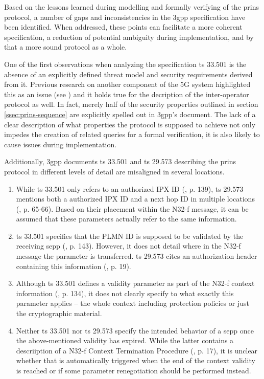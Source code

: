 Based on the lessons learned during modelling and formally verifying of the \gls{prins} protocol, a number of gaps and inconsistencies in the \gls{3gpp} specification have been identified.
When addressed, these points can facilitate a more coherent specification, a reduction of potential ambiguity during implementation, and by that a more sound protocol as a whole.

One of the first observations when analyzing the specification \gls{ts} 33.501 is the absence of an explicitly defined threat model and security requirements derived from it.
Previous research on another component of the 5G system highlighted this as an issue (see \cite{basin2018model}) and it holds true for the decription of the inter-operator protocol as well.
In fact, merely half of the security properties outlined in section \ref{ssec:prins-sequence} are explicitly spelled out in \gls{3gpp}'s document.
The lack of a clear description of what properties the protocol is supposed to achieve not only impedes the creation of related queries for a formal verification, it is also likely to cause issues during implementation.

Additionally, \gls{3gpp} documents \gls{ts} 33.501 and \gls{ts} 29.573 describing the \gls{prins} protocol in different levels of detail are misaligned in several locations.

\begin{enumerate}[label=--]
\item While \gls{ts} 33.501 only refers to an {\sffamily authorized IPX ID} (\cite{3gpp.33.501}, p. 139), \gls{ts} 29.573 mentions both a {\sffamily authorized IPX ID} and a {\sffamily next hop ID} in multiple locations (\cite{3gpp.29.573}, p. 65-66). Based on their placement within the N32-f message, it can be assumed that these parameters actually refer to the same information.

\item \gls{ts} 33.501 specifies that the {\sffamily PLMN ID} is supposed to be validated by the receiving \gls{sepp} (\cite{3gpp.33.501}, p. 143). However, it does not detail where in the N32-f message the parameter is transferred. \gls{ts} 29.573 cites an authorization header containing this information (\cite{3gpp.29.573}, p. 19).

\item Although \gls{ts} 33.501 defines a validity parameter as part of the N32-f context information (\cite{3gpp.33.501}, p. 134), it does not clearly specify to what exactly this parameter applies -- the whole context including protection policies or just the cryptographic material.

\item Neither \gls{ts} 33.501 nor \gls{ts} 29.573 specify the intended behavior of a \gls{sepp} once the above-mentioned validity has expired. While the latter contains a descriiption of a N32-f Context Termination Procedure (\cite{3gpp.29.573}, p. 17), it is unclear whether that is automatically triggered when the end of the context validity is reached or if some parameter renegotiation should be performed instead.
\end{enumerate}
